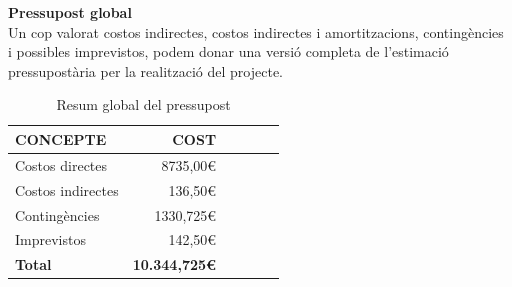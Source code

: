 \begin{table}[htb]
\centering
\label{PressupostImprevistos}
\caption{Imprevistos}
\end{table}

\noindent \textbf{\large Pressupost global}\\

\noindent Un cop valorat costos indirectes, costos indirectes i amortitzacions, contingències i possibles imprevistos, podem donar una versió completa de l’estimació pressupostària per la realització del projecte.

\begin{table}[htb]
\centering
\label{PressupostGlobal}
\begin{tabular}{lrrrrr}
\hline \textbf{CONCEPTE}                           &  \textbf{COST} \\
\hline
Costos directes                         & 8735,00\euro \\
Costos indirectes                         & 136,50\euro \\
Contingències                        & 1330,725\euro \\
Imprevistos                         & 142,50\euro \\
\hline
\textbf{Total}    &     \textbf{10.344,725\euro}       \\
\hline                      
\end{tabular}%
\caption{Resum global del pressupost}
\end{table}


